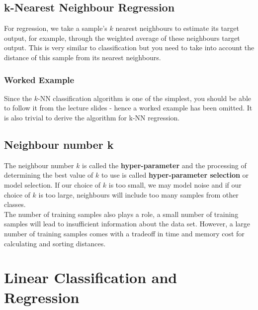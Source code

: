 \documentclass[11pt,fleqn]{book} %
\begin{document}
\section{k-Nearest Neighbour Regression}
For regression, we take a sample's $k$ nearest neighbours to estimate its target output, for example, through the weighted average of these neighbours target output. This is very similar to classification but you need to take into account the distance of this sample from its nearest neighbours.

\subsection*{Worked Example}
Since the $k$-NN classification algorithm is one of the simplest, you should be able to follow it from the lecture slides - hence a worked example has been omitted. It is also trivial to derive the algorithm for k-NN regression.

\section{Neighbour number k}
The neighbour number $k$ is called the \textbf{hyper-parameter} and the processing of determining the best value of $k$ to use is called \textbf{hyper-parameter selection} or model selection. If our choice of $k$ is too small, we may model noise and if our choice of $k$ is too large, neighbours will include too many samples from other classes.\\

\noindent
The number of training samples also plays a role, a small number of training samples will lead to insufficient information about the data set. However, a large number of training samples comes with a tradeoff in time and memory cost for calculating and sorting distances.



\chapter{Linear Classification and Regression}
\end{document}
